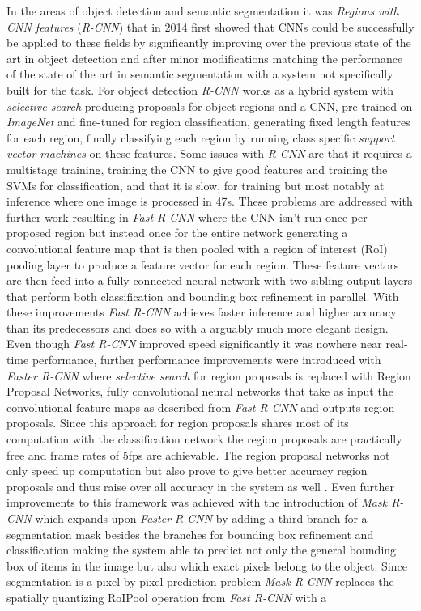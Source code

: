 \documentclass{kththesis}
\newcommand{\bibentry}[1]{\parencite{#1}}
\begin{document}
In the areas of object detection and semantic segmentation it was \emph{Regions with CNN features} (\emph{R-CNN}) \bibentry{girshick2014rich} that in 2014 first showed that CNNs could be successfully be applied to these fields by significantly improving over the previous state of the art in object detection \bibentry{ren2013histograms} and after minor modifications matching the performance of the state of the art in semantic segmentation \bibentry{carreira2012semantic} with a system not specifically built for the task. For object detection \emph{R-CNN} works as a hybrid system with \emph{selective search} \bibentry{uijlings2013selective} producing proposals for object regions and a CNN, pre-trained on \emph{ImageNet} \bibentry{deng2009imagenet} and fine-tuned for region classification, generating fixed length features for each region, finally classifying each region by running class specific \emph{support vector machines} \bibentry{boser1992training} on these features. Some issues with \emph{R-CNN} are that it requires a multistage training, training the CNN to give good features and training the SVMs for classification, and that it is slow, for training but most notably at inference where one image is processed in 47s. These problems are addressed with further work resulting in \emph{Fast R-CNN} \bibentry{girshick2015fast} where the CNN isn't run once per proposed region but instead once for the entire network generating a convolutional feature map that is then pooled with a region of interest (RoI) pooling layer to produce a feature vector for each region. These feature vectors are then feed into a fully connected neural network with two sibling output layers that perform both classification and bounding box refinement in parallel. With these improvements \emph{Fast R-CNN} achieves faster inference and higher accuracy than its predecessors and does so with a arguably much more elegant design. Even though \emph{Fast R-CNN} improved speed significantly it was nowhere near real-time performance, further performance improvements were introduced with \emph{Faster R-CNN} \bibentry{ren2015faster} where \emph{selective search} for region proposals is replaced with Region Proposal Networks, fully convolutional neural networks that take as input the convolutional feature maps as described from \emph{Fast R-CNN} and outputs region proposals. Since this approach for region proposals shares most of its computation with the classification network the region proposals are practically free and frame rates of 5fps are achievable. The region proposal networks not only speed up computation but also prove to give better accuracy region proposals and thus raise over all accuracy in the system as well \bibentry{ren2015faster}. Even further improvements to this framework was achieved with the introduction of \emph{Mask R-CNN} \bibentry{he2017mask} which expands upon \emph{Faster R-CNN} by adding a third branch for a segmentation mask besides the branches for bounding box refinement and classification making the system able to predict not only the general bounding box of items in the image but also which exact pixels belong to the object. Since segmentation is a pixel-by-pixel prediction problem \emph{Mask R-CNN} replaces the spatially quantizing RoIPool operation from \emph{Fast R-CNN} with a 
\end{document}
